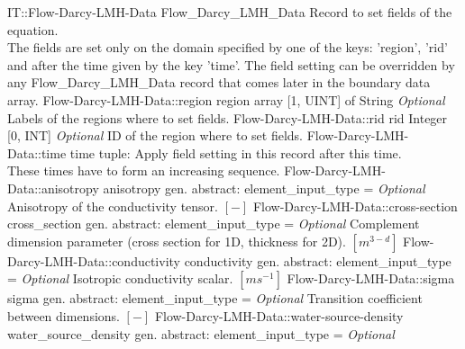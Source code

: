 \begin{RecordType}
	{IT::Flow-Darcy-LMH-Data}
	{Flow{\_}Darcy{\_}LMH{\_}Data}
	{}%
	{}%
	{{{Record to set fields of the equation.}\\{
The fields are set only on the domain specified by one of the keys: 'region', 'rid'}\\{
and after the time given by the key 'time'. The field setting can be overridden by}\\{
 any Flow{\_}Darcy{\_}LMH{\_}Data record that comes later in the boundary data array.}%
}}
		\RecKey
			{Flow-Darcy-LMH-Data::region}
			{region}
			{{array [1, UINT] of }{String}}{}
			{ \it{Optional}}
			{{{Labels of the regions where to set fields. }%
}}
		\RecKey
			{Flow-Darcy-LMH-Data::rid}
			{rid}
			{{Integer [0, INT]}}{}
			{ \it{Optional}}
			{{{ID of the region where to set fields.}%
}}
		\RecKey
			{Flow-Darcy-LMH-Data::time}
			{time}
			{{tuple: }}{}
			{ }
			{{{Apply field setting in this record after this time.}\\{
These times have to form an increasing sequence.}%
}}
		\RecKey
			{Flow-Darcy-LMH-Data::anisotropy}
			{anisotropy}
			{{gen. abstract: }}{{element{\_}input{\_}type}{ = }}
			{ \it{Optional}}
			{{{Anisotropy of the conductivity tensor. }{$[-]$}%
}}
		\RecKey
			{Flow-Darcy-LMH-Data::cross-section}
			{cross{\_}section}
			{{gen. abstract: }}{{element{\_}input{\_}type}{ = }}
			{ \it{Optional}}
			{{{Complement dimension parameter (cross section for 1D, thickness for 2D). }{$[m^{3-d}]$}%
}}
		\RecKey
			{Flow-Darcy-LMH-Data::conductivity}
			{conductivity}
			{{gen. abstract: }}{{element{\_}input{\_}type}{ = }}
			{ \it{Optional}}
			{{{Isotropic conductivity scalar. }{$[ms^{-1}]$}%
}}
		\RecKey
			{Flow-Darcy-LMH-Data::sigma}
			{sigma}
			{{gen. abstract: }}{{element{\_}input{\_}type}{ = }}
			{ \it{Optional}}
			{{{Transition coefficient between dimensions. }{$[-]$}%
}}
		\RecKey
			{Flow-Darcy-LMH-Data::water-source-density}
			{water{\_}source{\_}density}
			{{gen. abstract: }}{{element{\_}input{\_}type}{ = }}
			{ \it{Optional}}

\end{RecordType}
